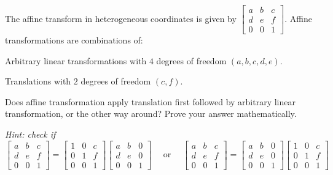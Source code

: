 \begin{problem}
  The affine transform in heterogeneous coordinates
  is given by
  $
    \begin{bmatrix}
      a & b & c \\
      d & e & f \\
      0 & 0 & 1
    \end{bmatrix}
  $. Affine transformations are combinations of:
  \begin{enumroman}
    \item Arbitrary linear transformations with $4$ degrees
      of freedom $(a, b, c, d, e)$.
    \item Translations with $2$ degrees of freedom $(c, f)$.
  \end{enumroman}
  
  \step
  Does affine transformation apply translation first followed by
  arbitrary linear transformation, or the other way around?
  Prove your answer mathematically.

  \step
  \emph{Hint: check if}\\
  $
    \begin{bmatrix}
      a & b & c \\
      d & e & f \\
      0 & 0 & 1
    \end{bmatrix}
    = 
    \begin{bmatrix}
      1 & 0 & c \\
      0 & 1 & f \\
      0 & 0 & 1
    \end{bmatrix}
    \begin{bmatrix}
      a & b & 0 \\
      d & e & 0 \\
      0 & 0 & 1
    \end{bmatrix}
    \quad \text{ or } \quad 
    \begin{bmatrix}
      a & b & c \\
      d & e & f \\
      0 & 0 & 1
    \end{bmatrix}
    =
    \begin{bmatrix}
      a & b & 0 \\
      d & e & 0 \\
      0 & 0 & 1
    \end{bmatrix}
    \begin{bmatrix}
      1 & 0 & c \\
      0 & 1 & f \\
      0 & 0 & 1
    \end{bmatrix}
  $

\end{problem}
